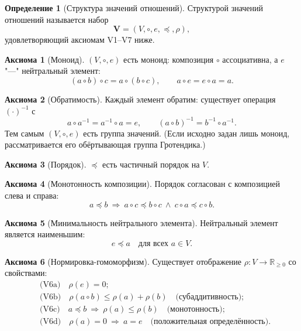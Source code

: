 \documentclass[12pt,a4paper]{article}
\theoremstyle{definition}
\newtheorem{definition}{Определение}[section]
\newtheorem{axiom}{Аксиома}[section]
\theoremstyle{plain}
\theoremstyle{remark}
\newcommand{\Values}{V}
\newcommand{\Vstruct}{\mathbf V}
\newcommand{\comp}{\circ}
\newcommand{\Vord}{\preceq}
\newcommand{\norm}{\rho}
\newcommand{\ide}{e}
\begin{document}
\begin{definition}[Структура значений отношений]
Структурой значений отношений называется набор
\[
\Vstruct=(\Values,\comp,\ide,\Vord,\norm),
\]
удовлетворяющий аксиомам V1--V7 ниже.
\end{definition}

\begin{axiom}[Моноид]
$(\Values,\comp,\ide)$ есть моноид: композиция $\comp$ ассоциативна, а $\ide$ "---" нейтральный элемент:
\[
(a\comp b)\comp c=a\comp(b\comp c),\qquad a\comp\ide=\ide\comp a=a.
\]
\end{axiom}

\begin{axiom}[Обратимость]
Каждый элемент обратим: существует операция $(\cdot)^{-1}$ с
\[
a\comp a^{-1}=a^{-1}\comp a=\ide,\qquad (a\comp b)^{-1}=b^{-1}\comp a^{-1}.
\]
Тем самым $(\Values,\comp,\ide)$ есть группа значений. (Если исходно задан лишь
моноид, рассматривается его обёртывающая группа Гротендика.)
\end{axiom}

\begin{axiom}[Порядок]
$\Vord$ есть частичный порядок на $\Values$.
\end{axiom}

\begin{axiom}[Монотонность композиции]
Порядок согласован с композицией слева и справа:
\[
a\Vord b\ \Longrightarrow\ a\comp c\Vord b\comp c\ \wedge\ c\comp a\Vord c\comp b.
\]
\end{axiom}

\begin{axiom}[Минимальность нейтрального элемента]
Нейтральный элемент является наименьшим:
\[
\ide\Vord a\quad\text{для всех }a\in\Values.
\]
\end{axiom}

\begin{axiom}[Нормировка-гомоморфизм]
Существует отображение $\norm:\Values\to\mathbb R_{\ge0}$ со свойствами:
\begin{align}
&\text{(V6a)}\quad \norm(\ide)=0;\\
&\text{(V6b)}\quad \norm(a\comp b)\le\norm(a)+\norm(b)\quad\text{(субаддитивность)};\\
&\text{(V6c)}\quad a\Vord b\ \Longrightarrow\ \norm(a)\le\norm(b)\quad\text{(монотонность)};\\
&\text{(V6d)}\quad \norm(a)=0\ \Longrightarrow\ a=\ide\quad\text{(положительная определённость)}.
\end{align}
\end{axiom}
\end{document}
